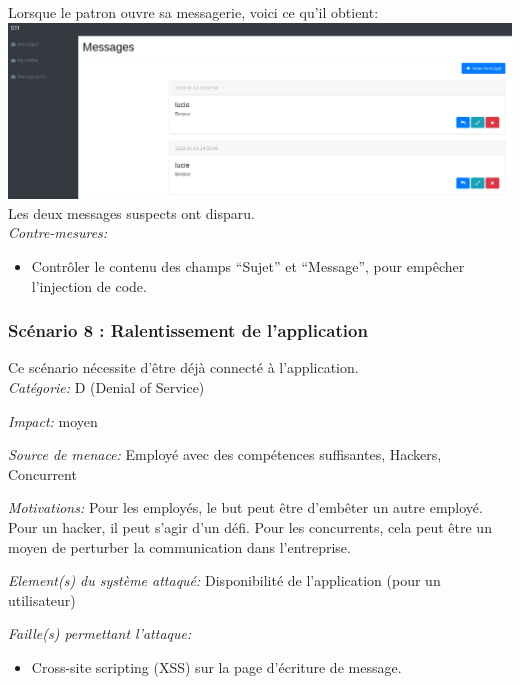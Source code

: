 \documentclass{article}
\begin{document}
Lorsque le patron ouvre sa messagerie, voici ce qu'il obtient:\\

\includegraphics[width=\textwidth]{images/delete8.PNG}\\

Les deux messages suspects ont disparu.\\

\textit{Contre-mesures:}

\begin{itemize}

\item
  Contrôler le contenu des champs ``Sujet'' et ``Message'', pour
  empêcher l'injection de code.
\end{itemize}

\subsubsection{Scénario 8 : Ralentissement de l'application}

Ce scénario nécessite d'être déjà connecté à l'application.\\

\textit{Catégorie:} D (Denial of Service)

\textit{Impact:} moyen

\textit{Source de menace:} Employé avec des compétences suffisantes,
Hackers, Concurrent

\textit{Motivations:} Pour les employés, le but peut être d'embêter un autre employé. Pour un hacker, il peut s'agir d'un défi. Pour les concurrents, cela peut être un moyen de perturber la
  communication dans l'entreprise.

\textit{Element(s) du système attaqué:} Disponibilité de l'application
(pour un utilisateur)

\textit{Faille(s) permettant l'attaque:}

\begin{itemize}

\item
  Cross-site scripting (XSS) sur la page d'écriture de message.
\end{itemize}
\end{document}
